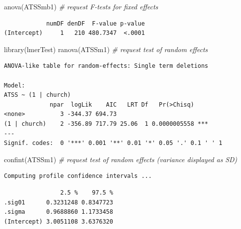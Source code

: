 \documentclass[
  english,
]{book}
\newenvironment{Shaded}{\begin{snugshade}}{\end{snugshade}}
\newcommand{\CommentTok}[1]{\textcolor[rgb]{0.56,0.35,0.01}{\textit{#1}}}
\newcommand{\FunctionTok}[1]{\textcolor[rgb]{0.00,0.00,0.00}{#1}}
\newcommand{\NormalTok}[1]{#1}
\begin{document}
\begin{Shaded}
\begin{Highlighting}[]
\FunctionTok{anova}\NormalTok{(ATSSmb1) }\CommentTok{\# request F{-}tests for fixed effects}
\end{Highlighting}
\end{Shaded}

\begin{verbatim}
            numDF denDF  F-value p-value
(Intercept)     1   210 480.7347  <.0001
\end{verbatim}

\begin{Shaded}
\begin{Highlighting}[]
\FunctionTok{library}\NormalTok{(lmerTest)}
\FunctionTok{ranova}\NormalTok{(ATSSm1) }\CommentTok{\# request test of random effects}
\end{Highlighting}
\end{Shaded}

\begin{verbatim}
ANOVA-like table for random-effects: Single term deletions

Model:
ATSS ~ (1 | church)
             npar  logLik    AIC   LRT Df   Pr(>Chisq)    
<none>          3 -344.37 694.73                          
(1 | church)    2 -356.89 717.79 25.06  1 0.0000005558 ***
---
Signif. codes:  0 '***' 0.001 '**' 0.01 '*' 0.05 '.' 0.1 ' ' 1
\end{verbatim}

\begin{Shaded}
\begin{Highlighting}[]
\FunctionTok{confint}\NormalTok{(ATSSm1) }\CommentTok{\# request test of random effects (variance displayed as SD)}
\end{Highlighting}
\end{Shaded}

\begin{verbatim}
Computing profile confidence intervals ...
\end{verbatim}

\begin{verbatim}
                2.5 %    97.5 %
.sig01      0.3231248 0.8347723
.sigma      0.9688860 1.1733458
(Intercept) 3.0051108 3.6376320
\end{verbatim}
\end{document}
